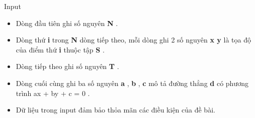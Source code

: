Input
\begin{itemize}
	\item     Dòng đầu tiên ghi số nguyên    \textbf{     N    }    .   
	\item     Dòng thứ    \textbf{     i    }    trong    \textbf{     N    }    dòng tiếp theo, mỗi dòng ghi 2 số nguyên    \textbf{     x y    }    là tọa độ của điểm thứ    \textbf{     i    }    thuộc tập    \textbf{     S    }    .   
	\item     Dòng tiếp theo ghi số nguyên    \textbf{     T    }    .   
	\item     Dòng cuối cùng ghi ba số nguyên    \textbf{     a    }    ,    \textbf{     b    }    ,    \textbf{     c    }    mô tả đường thẳng    \textbf{     d    }    có phương trình    ax + by + c = 0    .   
	\item     Dữ liệu trong input đảm bảo thỏa mãn các điều kiện của đề bài.   
\end{itemize}